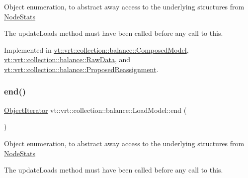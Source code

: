 Object enumeration, to abstract away access to the underlying structures from \hyperlink{structvt_1_1vrt_1_1collection_1_1balance_1_1_node_stats}{Node\+Stats}

The {\ttfamily update\+Loads} method must have been called before any call to this. 

Implemented in \hyperlink{classvt_1_1vrt_1_1collection_1_1balance_1_1_composed_model_a8f34205887c08a22a1e5bef6ee358f2b}{vt\+::vrt\+::collection\+::balance\+::\+Composed\+Model}, \hyperlink{structvt_1_1vrt_1_1collection_1_1balance_1_1_raw_data_a54351249212ade8b2d25a857e71b256f}{vt\+::vrt\+::collection\+::balance\+::\+Raw\+Data}, and \hyperlink{structvt_1_1vrt_1_1collection_1_1balance_1_1_proposed_reassignment_aef7e98817093a99fbda1eaae7cb29f79}{vt\+::vrt\+::collection\+::balance\+::\+Proposed\+Reassignment}.

\mbox{\label{structvt_1_1vrt_1_1collection_1_1balance_1_1_load_model_ab9258269a83575b36d7dd3b9a4121652}} 
\subsubsection{\texorpdfstring{end()}{end()}}
{\footnotesize\ttfamily \hyperlink{structvt_1_1vrt_1_1collection_1_1balance_1_1_object_iterator}{Object\+Iterator} vt\+::vrt\+::collection\+::balance\+::\+Load\+Model\+::end (\begin{DoxyParamCaption}{ }\end{DoxyParamCaption})\hspace{0.3cm}{\ttfamily [inline]}}

Object enumeration, to abstract away access to the underlying structures from \hyperlink{structvt_1_1vrt_1_1collection_1_1balance_1_1_node_stats}{Node\+Stats}

The {\ttfamily update\+Loads} method must have been called before any call to this. \mbox{\label{structvt_1_1vrt_1_1collection_1_1balance_1_1_load_model_a999b155237ce8ba253019e783462a9aa}} 

